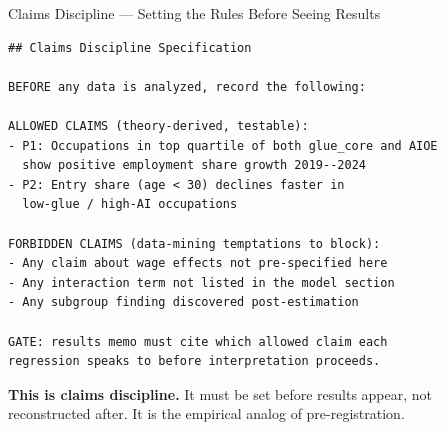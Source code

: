 \documentclass[10pt,english,aspectratio=169]{beamer}
\begin{document}
\begin{frame}[fragile]{Claims Discipline --- Setting the Rules Before Seeing Results}
\begin{lstlisting}[style=markdownstyle, basicstyle=\tiny\ttfamily]
## Claims Discipline Specification

BEFORE any data is analyzed, record the following:

ALLOWED CLAIMS (theory-derived, testable):
- P1: Occupations in top quartile of both glue_core and AIOE
  show positive employment share growth 2019--2024
- P2: Entry share (age < 30) declines faster in
  low-glue / high-AI occupations

FORBIDDEN CLAIMS (data-mining temptations to block):
- Any claim about wage effects not pre-specified here
- Any interaction term not listed in the model section
- Any subgroup finding discovered post-estimation

GATE: results memo must cite which allowed claim each
regression speaks to before interpretation proceeds.
\end{lstlisting}
\footnotesize\textbf{This is claims discipline.} It must be set before results appear, not reconstructed after.
It is the empirical analog of pre-registration.
\end{frame}
\end{document}
